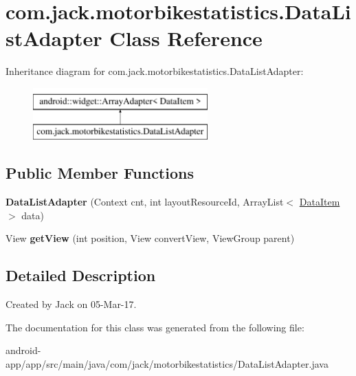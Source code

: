 \hypertarget{classcom_1_1jack_1_1motorbikestatistics_1_1_data_list_adapter}{}\section{com.\+jack.\+motorbikestatistics.\+Data\+List\+Adapter Class Reference}
\label{classcom_1_1jack_1_1motorbikestatistics_1_1_data_list_adapter}
Inheritance diagram for com.\+jack.\+motorbikestatistics.\+Data\+List\+Adapter\+:\begin{figure}[H]
\begin{center}
\leavevmode
\includegraphics[height=2.000000cm]{classcom_1_1jack_1_1motorbikestatistics_1_1_data_list_adapter}
\end{center}
\end{figure}
\subsection*{Public Member Functions}
\begin{DoxyCompactItemize}
\item 
\mbox{\label{classcom_1_1jack_1_1motorbikestatistics_1_1_data_list_adapter_aa9aad25299a2df8a357569b6eb3c28b5}} 
{\bfseries Data\+List\+Adapter} (Context cnt, int layout\+Resource\+Id, Array\+List$<$ \hyperlink{classcom_1_1jack_1_1motorbikestatistics_1_1_data_item}{Data\+Item} $>$ data)
\item 
\mbox{\label{classcom_1_1jack_1_1motorbikestatistics_1_1_data_list_adapter_a724cb5f4a43bba97dbfdbc08aa9e3015}} 
View {\bfseries get\+View} (int position, View convert\+View, View\+Group parent)
\end{DoxyCompactItemize}


\subsection{Detailed Description}
Created by Jack on 05-\/\+Mar-\/17. 

The documentation for this class was generated from the following file\+:\begin{DoxyCompactItemize}
\item 
android-\/app/app/src/main/java/com/jack/motorbikestatistics/Data\+List\+Adapter.\+java\end{DoxyCompactItemize}

